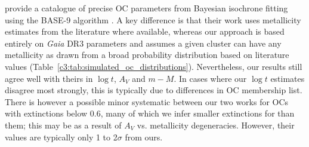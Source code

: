 \cite{bossini_age_2019} provide a catalogue of precise OC parameters from Bayesian isochrone fitting using the BASE-9 algorithm \citep{hippel_inverting_2006}. A key difference is that their work uses metallicity estimates from the literature where available, whereas our approach is based entirely on \emph{Gaia} DR3 parameters and assumes a given cluster can have any metallicity as drawn from a broad probability distribution based on literature values (Table~\ref{c3:tab:simulated_oc_distributions}). Nevertheless, our results still agree well with theirs in $\log t$, $A_V$ and $m-M$. In cases where our $\log t$ estimates disagree most strongly, this is typically due to differences in OC membership list. There is however a possible minor systematic between our two works for OCs with extinctions below 0.6, many of which we infer smaller extinctions for than them; this may be as a result of $A_V$ vs. metallicity degeneracies. However, their values are typically only 1 to 2$\sigma$ from ours.

